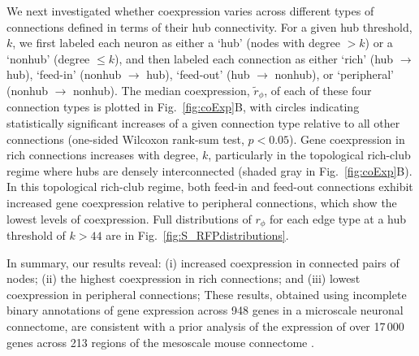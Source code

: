 \documentclass[10pt,letterpaper]{article}
\begin{document}
We next investigated whether coexpression varies across different types of connections defined in terms of their hub connectivity.
For a given hub threshold, $k$, we first labeled each neuron as either a `hub' (nodes with degree $> k$) or a `nonhub' (degree $\leq k$), and then labeled each connection as either `rich' (hub $\rightarrow$ hub), `feed-in' (nonhub $\rightarrow$ hub), `feed-out' (hub $\rightarrow$ nonhub), or `peripheral' (nonhub $\rightarrow$ nonhub).
The median coexpression, $\tilde{r}_\phi$, of each of these four connection types is plotted in Fig.~\ref{fig:coExp}B, with circles indicating statistically significant increases of a given connection type relative to all other connections (one-sided Wilcoxon rank-sum test, $p < 0.05$).
Gene coexpression in rich connections increases with degree, $k$, particularly in the topological rich-club regime where hubs are densely interconnected (shaded gray in Fig.~\ref{fig:coExp}B).
In this topological rich-club regime, both feed-in and feed-out connections exhibit increased gene coexpression relative to peripheral connections, which show the lowest levels of coexpression.
Full distributions of $r_\phi$ for each edge type at a hub threshold of $k > 44$ are in Fig.~\ref{fig:S_RFPdistributions}.

In summary, our results reveal:
(i) increased coexpression in connected pairs of nodes;
(ii) the highest coexpression in rich connections; and
(iii) lowest coexpression in peripheral connections;
These results, obtained using incomplete binary annotations of gene expression across 948 genes in a microscale neuronal connectome, are consistent with a prior analysis of the expression of over 17\,000 genes across 213 regions of the mesoscale mouse connectome \cite{Fulcher:2016ck}.
\end{document}

